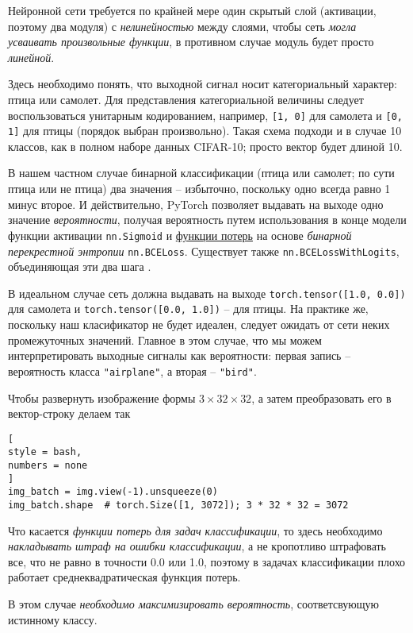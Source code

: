 \documentclass[%
	11pt,
	a4paper,
	utf8,
		]{article}
\begin{document}
Нейронной сети требуется по крайней мере один скрытый слой (активации, поэтому два модуля) с \emph{нелинейностью} между слоями, чтобы сеть \emph{могла усваивать произвольные функции}, в противном случае модуль будет просто \emph{линейной}.

Здесь необходимо понять, что выходной сигнал носит категориальный характер: птица или самолет. Для представления категориальной величины следует воспользоваться унитарным кодированием, например, \verb|[1, 0]| для самолета и \verb|[0, 1]| для птицы (порядок выбран произвольно). Такая схема подходи и в случае 10 классов, как в полном наборе данных CIFAR-10; просто вектор будет длиной 10.

В нашем частном случае бинарной классификации (птица или самолет; по сути птица или не птица) два значения -- избыточно, поскольку одно всегда равно 1 минус второе. И действительно, PyTorch позволяет выдавать на выходе одно значение \emph{вероятности}, получая вероятность путем использования в конце модели функции активации \verb|nn.Sigmoid| и \underline{функции потерь} на основе \emph{бинарной перекрестной энтропии} \verb|nn.BCELoss|. Существует также \verb|nn.BCELossWithLogits|, объединяющая эти два шага \cite[]{pytorch-2022}.

В идеальном случае сеть должна выдавать на выходе \verb|torch.tensor([1.0, 0.0])| для самолета и \verb|torch.tensor([0.0, 1.0])| -- для птицы. На практике же, поскольку наш класификатор не будет идеален, следует ожидать от сети неких промежуточных значений. Главное в этом случае, что мы можем интерпретировать выходные сигналы как вероятности: первая запись -- вероятность класса \verb|"airplane"|, а вторая -- \verb|"bird"|.

Чтобы развернуть изображение формы $3 \times 32 \times 32$, а затем преобразовать его в вектор-строку делаем так
\begin{lstlisting}[
style = bash,
numbers = none
]
img_batch = img.view(-1).unsqueeze(0)
img_batch.shape  # torch.Size([1, 3072]); 3 * 32 * 32 = 3072
\end{lstlisting}

Что касается \emph{функции потерь для задач классификации}, то здесь необходимо \emph{накладывать штраф на ошибки классификации}, а не кропотливо штрафовать все, что не равно в точности 0.0 или 1.0, поэтому в задачах классификации плохо работает среднеквадратическая функция потерь.

В этом случае \emph{необходимо максимизировать вероятность}, соответсвующую истинному классу.
\end{document}

